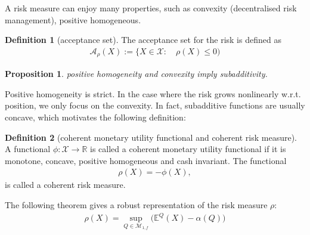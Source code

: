 \documentclass[a4paper,11pt]{book}
\newtheorem{proposition}[theorem]{Proposition}
\theoremstyle{definition}
\newtheorem{definition}{Definition}[section]
\theoremstyle{remark}
\begin{document}
A risk measure can enjoy many properties, such as convexity (decentralised risk management), positive homogeneous. 

\begin{definition}[acceptance set]
	The acceptance set for the risk  is defined as 
	\begin{align*}
		\mathcal{A}_\rho (X):= \{ X \in \mathcal{X}: \quad \rho(X) \le 0)
	\end{align*}
\end{definition}

\begin{proposition}
	positive homogeneity and convexity imply subadditivity. 
\end{proposition}
Positive homogeneity is strict. In the case where the risk grows nonlinearly w.r.t. position, we only focus on the convexity. In fact, subadditive functions are usually concave, which motivates the following definition:

\begin{definition}[coherent monetary utility functional and coherent risk measure]
A functional $\phi: \mathcal{X} \rightarrow \mathbb{R}$ is called a coherent monetary utility functional if it is monotone, concave, positive homogeneous and cash invariant. The functional 
\begin{align*}
	\rho(X) = - \phi(X),
\end{align*}
is called a coherent risk measure. 
\end{definition}

The following theorem gives a robust representation of the risk measure $\rho$: 
\begin{align*}
	\rho(X) = \sup_{Q \in \mathcal{M}_{1, f}} \bigg( \mathbb{E}^Q(X) - \alpha (Q) \bigg)
\end{align*}
\end{document}
